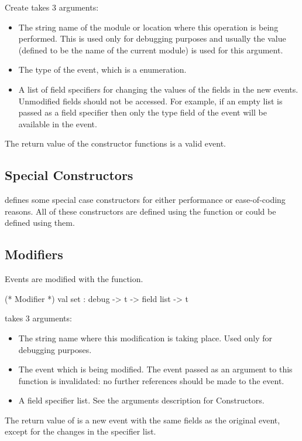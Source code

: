 Create takes 3 arguments:
\begin{itemize}
\item
The string name of the module or location where this operation is being
performed.  This is used only for debugging purposes and usually the value
 (defined to be the name of the current module) is used for
this argument.
\item
The type of the event, which is a  enumeration.
\item
A list of field specifiers for changing the values of the fields in the new
events.  Unmodified fields should not be accessed.  For example, if an empty
list is passed as a field specifier then only the type field of the event will
be available in the event.
\end{itemize}
The return value of the constructor functions is a valid event.

\subsection{Special Constructors}
 defines some special case constructors for either
performance or ease-of-coding reasons.  All of these constructors are defined
using the  function or could be defined using them.

\subsection{Modifiers}
Events are modified with the  function.

\begin{codebox}
  (* Modifier *)
val set		: debug -> t -> field list -> t
\end{codebox}

 takes 3 arguments:
\begin{itemize}
\item
The string name where this modification is taking place.  Used only for
debugging purposes.
\item
The event which is being modified.  The event passed as an argument to this
function is invalidated: no further references should be made to the event.
\item
A field specifier list.  See the arguments description for Constructors.
\end{itemize}
The return value of  is a new event with the same fields as the
original event, except for the changes in the specifier list.

